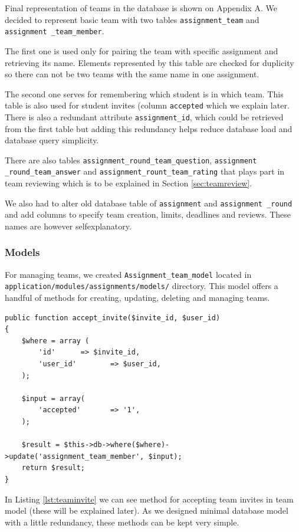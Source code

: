 Final representation of teams in the database is shown on Appendix A. We decided to represent basic team with two tables \texttt{assignment\_team} and \texttt{assignment \_team\-\_member}.

The first one is used only for pairing the team with specific assignment and retrieving its name. Elements represented by this table are checked for duplicity so there can not be two teams with the same name in one assignment.

The second one serves for remembering which student is in which team. This table is also used for student invites (column \texttt{accepted} which we explain later. There is also a redundant attribute \texttt{assignment\_id}, which could be retrieved from the first table but adding this redundancy helps reduce database load and database query simplicity.

There are also tables \texttt{assignment\_round\_team\_question}, \texttt{assignment \_round\_team\_answer} and \texttt{assignment\_rount\_team\_rating} that plays part in team reviewing which is to be explained in Section \ref{sec:teamreview}.

We also had to alter old database table of \texttt{assignment} and \texttt{assignment \_round} and add columns to specify team creation, limits, deadlines and reviews. These names are however self\-explanatory.

\subsubsection{Models}
For managing teams, we created \texttt{Assignment\_team\_model} located in \\ \texttt{application/modules/assignments/models/} directory. This model offers a handful of methods for creating, updating, deleting and managing teams.

\begin{lstlisting}[caption={Method for accepting team invites},label={lst:teaminvite}]
public function accept_invite($invite_id, $user_id)
{
    $where = array (
        'id'      => $invite_id,
        'user_id'        => $user_id,
    );

    $input = array(
        'accepted'       => '1',
    );

    $result = $this->db->where($where)->update('assignment_team_member', $input);
    return $result;
}
\end{lstlisting}

In Listing \ref{lst:teaminvite} we can see method for accepting team invites in team model (these will be explained later). As we designed minimal database model with a little redundancy, these methods can be kept very simple.

